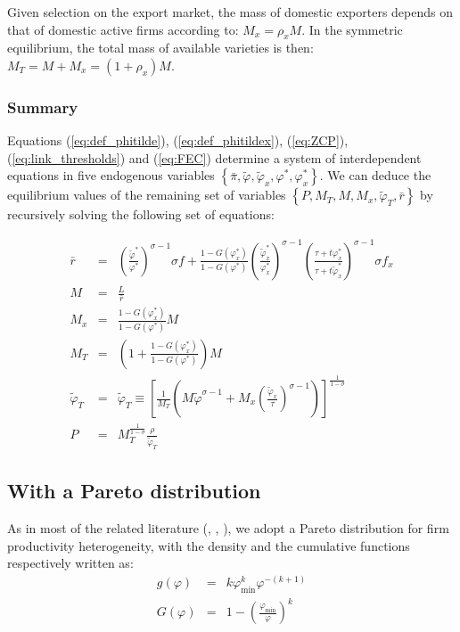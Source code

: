 \documentclass[a4paper,11pt]{article}
\begin{document}
Given selection on the export market, the mass of domestic exporters depends on that of domestic active firms according to: $M_x = \rho_x M$. In the symmetric equilibrium, the total mass of available varieties is then: $M_T= M+M_x = (1+\rho_x)M$.

\subsubsection{Summary}

Equations (\ref{eq:def_phitilde}), (\ref{eq:def_phitildex}), (\ref{eq:ZCP}), (\ref{eq:link_thresholds}) and (\ref{eq:FEC}) determine a system of interdependent equations in five endogenous variables $\left\{\bar{\pi}, \widetilde{\varphi}, \widetilde{\varphi}_x, \varphi^\ast, \varphi^\ast_x \right\}$. We can deduce the equilibrium values of the remaining set of variables $\left\{P, M_T, M, M_x, \widetilde{\varphi}_T, \bar{r} \right\}$ by recursively solving the following set of equations:

\begin{eqnarray*}
 \bar{r}&=& \left(\frac{\widetilde{\varphi}^\ast}{\varphi^\ast}\right)^{\sigma-1} \sigma f + \frac{1-G(\varphi^\ast_x)}{1-G(\varphi^\ast)}\left(\frac{\widetilde{\varphi}_x^\ast}{\varphi_x^\ast}\right)^{\sigma-1}\left(\frac{\tau+ t \varphi^\ast_x}{\tau+ t \widetilde{\varphi}^\ast_x}\right)^{\sigma-1} \sigma f_x \\
 M &=& \frac{L}{\bar{r}} \\
M_x &=& \frac{1-G(\varphi^\ast_x)}{1-G(\varphi^\ast)} M \\
M_T &=& \left(1+ \frac{1-G(\varphi^\ast_x)}{1-G(\varphi^\ast)} \right)M \\
\widetilde{\varphi}_T &=& \widetilde{\varphi}_T \equiv \left[\frac{1}{M_T}\left(M\widetilde{\varphi}^{\sigma-1} + M_x \left( \frac{\widetilde{\varphi}_x}{\tau} \right)^{\sigma-1} \right)  \right]^{\frac{1}{1-\sigma}} \\
P &=& M_T^{\frac{1}{1-\sigma}} \frac{\rho}{\widetilde{\varphi}_T}
\end{eqnarray*}


\subsection{With a Pareto distribution}


As in most of the related literature (\cite{Irrazabal_2015}, \cite{melitz-redding-Handbk-IT-2014}, \cite{ghironi}), we adopt a Pareto distribution for firm productivity heterogeneity, with the density and the cumulative functions respectively written as:
\begin{eqnarray*}
g(\varphi) &=& k\varphi_{\text{min}}^k \varphi^{-(k+1)}\\
G(\varphi) &=& 1 -\left( \frac{\varphi_{\text{min}}}{\varphi} \right)^k
\end{eqnarray*}
\end{document}

